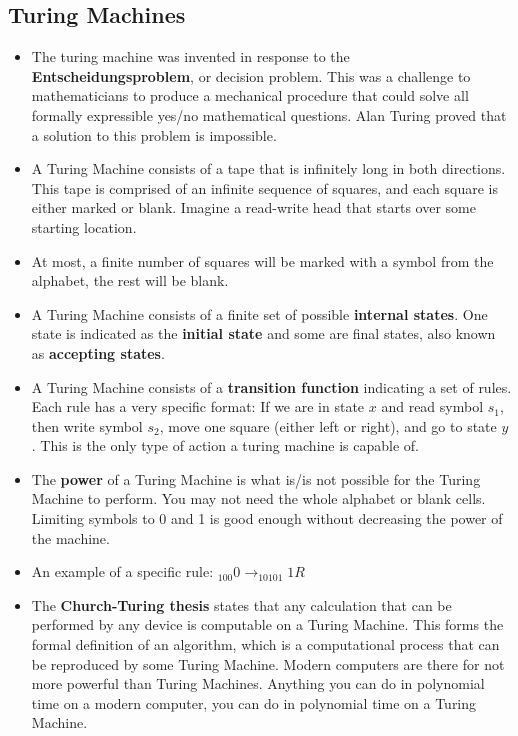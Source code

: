 \documentclass{article}
\begin{document}
\subsection*{Turing Machines}
\begin{itemize}
    \item The turing machine was invented in response to the \textbf{Entscheidungsproblem}, or decision problem. This was a challenge to mathematicians to produce a mechanical procedure that could solve all formally expressible yes/no mathematical questions. Alan Turing proved that a solution to this problem is impossible.
    \item A Turing Machine consists of a tape that is infinitely long in both directions. This tape is comprised of an infinite sequence of squares, and each square is either marked or blank. Imagine a read-write head that starts over some starting location.
    \item At most, a finite number of squares will be marked with a symbol from the alphabet, the rest will be blank.
    \item A Turing Machine consists of a finite set of possible \textbf{internal states}. One state is indicated as the \textbf{initial state} and some are final states, also known as \textbf{accepting states}.
    \item A Turing Machine consists of a \textbf{transition function} indicating a set of rules. Each rule has a very specific format: If we are in state \(x\) and read symbol \(s_1\), then write symbol \(s_2\), move one square (either left or right), and go to state \(y\). This is the only type of action a turing machine is capable of.
    \item The \textbf{power} of a Turing Machine is what is/is not possible for the Turing Machine to perform. You may not need the whole alphabet or blank cells. Limiting symbols to 0 and 1 is good enough without decreasing the power of the machine.
    \item An example of a specific rule: \(_{100}0 \rightarrow _{10101}\!\!1R\)
    \item The \textbf{Church-Turing thesis} states that any calculation that can be performed by any device is computable on a Turing Machine. This forms the formal definition of an algorithm, which is a computational process that can be reproduced by some Turing Machine. Modern computers are there for not more powerful than Turing Machines. Anything you can do in polynomial time on a modern computer, you can do in polynomial time on a Turing Machine.

\end{itemize}
\end{document}

